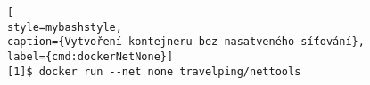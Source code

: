 \begin{lstfloat}
\begin{lstlisting}[
style=mybashstyle,
caption={Vytvoření kontejneru bez nasatveného síťování},
label={cmd:dockerNetNone}]
[1]$ docker run --net none travelping/nettools
\end{lstlisting}
\end{lstfloat}